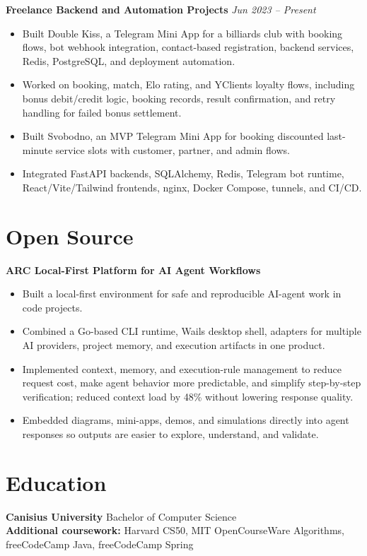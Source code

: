 \documentclass[10pt,a4paper]{article}
\begin{document}
\textbf{Freelance Backend and Automation Projects} \hfill \textit{Jun 2023 -- Present}
\begin{itemize}
  \item Built Double Kiss, a Telegram Mini App for a billiards club with booking flows, bot webhook integration, contact-based registration, backend services, Redis, PostgreSQL, and deployment automation.
  \item Worked on booking, match, Elo rating, and YClients loyalty flows, including bonus debit/credit logic, booking records, result confirmation, and retry handling for failed bonus settlement.
  \item Built Svobodno, an MVP Telegram Mini App for booking discounted last-minute service slots with customer, partner, and admin flows.
  \item Integrated FastAPI backends, SQLAlchemy, Redis, Telegram bot runtime, React/Vite/Tailwind frontends, nginx, Docker Compose, tunnels, and CI/CD.
\end{itemize}

\section*{Open Source}

\textbf{ARC \textbar{} Local-First Platform for AI Agent Workflows}
\begin{itemize}
  \item Built a local-first environment for safe and reproducible AI-agent work in code projects.
  \item Combined a Go-based CLI runtime, Wails desktop shell, adapters for multiple AI providers, project memory, and execution artifacts in one product.
  \item Implemented context, memory, and execution-rule management to reduce request cost, make agent behavior more predictable, and simplify step-by-step verification; reduced context load by 48\% without lowering response quality.
  \item Embedded diagrams, mini-apps, demos, and simulations directly into agent responses so outputs are easier to explore, understand, and validate.
\end{itemize}

\section*{Education}
\textbf{Canisius University} \textbar{} Bachelor of Computer Science\\
\textbf{Additional coursework:} Harvard CS50, MIT OpenCourseWare Algorithms, freeCodeCamp Java, freeCodeCamp Spring
\end{document}

